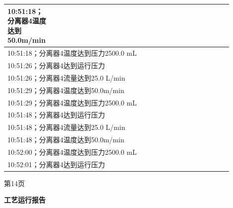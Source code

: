 \documentclass[UTF8,10pt,a4paper,fontset=fandol]{ctexart}
\newcommand{\fieldvalue}[1]{#1}
\begin{document}
\begin{center}
\begin{minipage}[t]{0.47\linewidth}
\begin{tabular}{|p{0.18\linewidth}|p{0.72\linewidth}|}
{\fieldvalue{10:51:18；分离器4温度达到50.0m/min}} \\ \hline
\multicolumn{2}{|l|}{
\fieldvalue{10:51:18；分离器4温度达到压力2500.0 mL}} \\ \hline
\multicolumn{2}{|l|}{
\fieldvalue{10:51:26；分离器4达到运行压力}} \\ \hline
\multicolumn{2}{|l|}{
\fieldvalue{10:51:26；分离器4流量达到25.0 L/min}} \\ \hline
\multicolumn{2}{|l|}{
\fieldvalue{10:51:29；分离器4温度达到50.0m/min}} \\ \hline
\multicolumn{2}{|l|}{
\fieldvalue{10:51:29；分离器4温度达到压力2500.0 mL}} \\ \hline
\multicolumn{2}{|l|}{
\fieldvalue{10:51:48；分离器4达到运行压力}} \\ \hline
\multicolumn{2}{|l|}{
\fieldvalue{10:51:48；分离器4流量达到25.0 L/min}} \\ \hline
\multicolumn{2}{|l|}{
\fieldvalue{10:51:48；分离器4温度达到50.0m/min}} \\ \hline
\multicolumn{2}{|l|}{
\fieldvalue{10:52:00；分离器4温度达到压力2500.0 mL}} \\ \hline
\multicolumn{2}{|l|}{
\fieldvalue{10:52:01；分离器4达到运行压力}} \\ \hline
\end{tabular}

\vspace{1mm}
第14页
\end{minipage}

\vspace{5mm}

\begin{minipage}[t]{0.47\linewidth}
\centering
\textbf{工艺运行报告}


\end{minipage}
\end{center}
\end{document}

